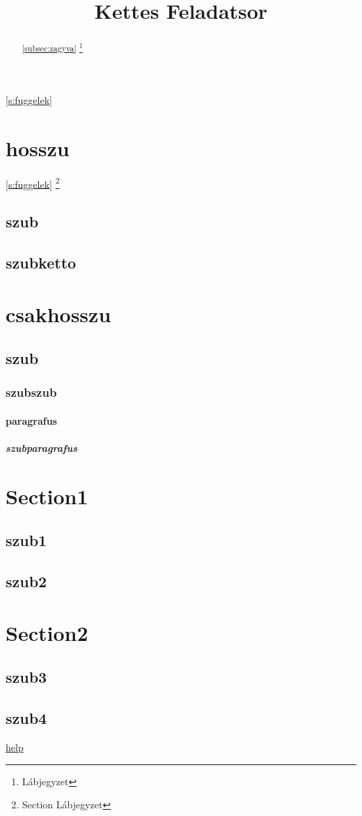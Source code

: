\documentclass[twoside,12pt]{article}
\begin{document}
\autoref{s:fuggelek}


\setcounter{tocdepth}{5}
\title{Kettes Feladatsor}
\maketitle
{}
\begin{abstract}
\ref{subsec:zagyva}
\hulipsum[2]
\renewcommand{\thefootnote}{\fnsymbol{footnote}}
\footnote{Lábjegyzet}
\end{abstract}
\tableofcontents
\newpage
{}
\section[rovid]{hosszu} \label{sec:elsoszakasz}
\ref{s:fuggelek}
\pageref{s:fuggelek}
\renewcommand{\thefootnote}{\fnsymbol{footnote}}
\footnote{Section Lábjegyzet}
\hulipsum[1]
\label{s:section}
\hulipsum[2]
\subsection{szub} \label{subsec:alszakasz}
\hulipsum
\subsection{szubketto}
\hulipsum
\setcounter{secnumdepth}{5}
\section{csakhosszu} \label{sec:masodikszakasz}
\subsection{szub}
\subsubsection{szubszub}
\paragraph{paragrafus}
\subparagraph{szubparagrafus}
\label{s:subpara}
\appendix
\label{s:fuggelek}
\section{Section1}
\subsection{szub1}
\quote
\hulipsum[2]
\subsection{szub2}
\quotation
\hulipsum[2]
\section{Section2}
\subsection{szub3}\label{subsec:zagyva}
\begin{verse}
\hulipsum[2]
\end{verse}
\subsection{szub4}
\href{https://www.uni-miskolc.hu/~viktoria.vadon/TEX/2het/2_dokszerk_folyt.pdf}{help}
\end{document}
